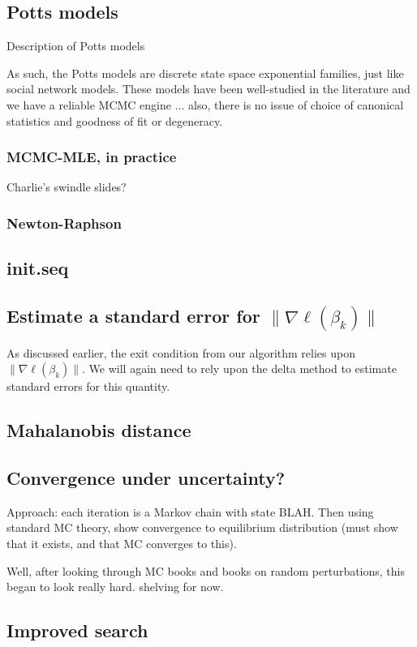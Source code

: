 \subsection{Potts models}
Description of Potts models

As such, the Potts models are discrete state space exponential families, just like social network models.  These models have been well-studied in the literature and we have a reliable MCMC engine ... also, there is no issue of choice of canonical statistics and goodness of fit or degeneracy.

\subsubsection{MCMC-MLE, in practice}
Charlie's swindle slides?

\subsubsection{Newton-Raphson}

\subsection{init.seq}

\subsection{Estimate a standard error for $\parallel \nabla \ell( \beta_k ) \parallel$ }
As discussed earlier, the exit condition from our algorithm relies upon $\parallel \nabla \ell( \beta_k ) \parallel$.  We will again need to rely upon the delta method to estimate standard errors for this quantity.

\subsection{Mahalanobis distance}

\subsection{Convergence under uncertainty?}
Approach: each iteration is a Markov chain with state BLAH.  Then using standard MC theory, show convergence to equilibrium distribution (must show that it exists, and that MC converges to this).

Well, after looking through MC books and books on random perturbations, this began to look really hard.  shelving for now.

\subsection{Improved search}



